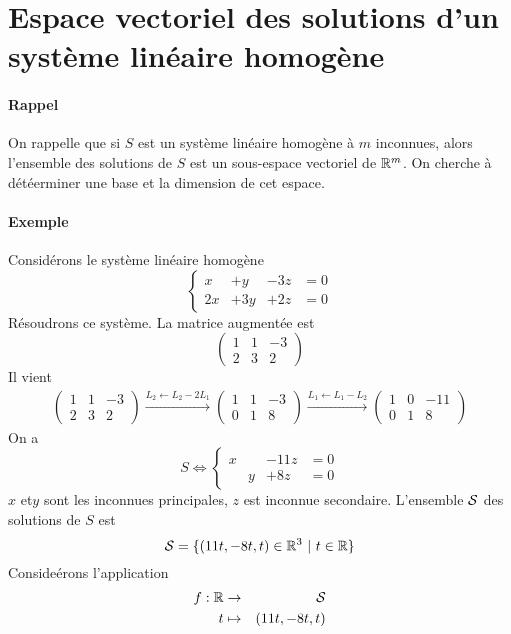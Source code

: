%
%
\section{Espace vectoriel des solutions d'un système linéaire homogène}
%
%
\paragraph{Rappel} On rappelle que si $S$ est un système linéaire homogène à $m$ inconnues, alors l'ensemble des solutions de $S$ est un sous-espace vectoriel de $\mathbb{R}^m$. On cherche à détéerminer une base et la dimension de cet espace.

\paragraph{Exemple} Considérons le système linéaire homogène
$$\left\{\begin{array}{cccc}
   x & + y & -3z & = 0 \\
  2x & +3y & +2z & = 0
\end{array}\right. $$
Résoudrons ce système. La matrice augmentée est
$$\begin{pmatrix}
 1 & 1 & -3 \\
 2 & 3 & 2
\end{pmatrix}$$
Il vient
\begin{eqnarray*}
  \begin{pmatrix} 
    1 & 1 &-3 \\ 
    2 &3 & 2
  \end{pmatrix} 
  \xrightarrow{L_2 \leftarrow L_2 - 2L_1}
  \begin{pmatrix}
    1 & 1 &-3 \\ 
    0 & 1 & 8
  \end{pmatrix} 
  \xrightarrow{L_1 \leftarrow L_1 - L_2}
  \begin{pmatrix} 
    1 & 0 & -11 \\ 
    0 & 1 & 8
  \end{pmatrix}
\end{eqnarray*}
On a 
$$S \Leftrightarrow \left\{\begin{array}{cccc} x & & -11 z & = 0 \\ & y & +8 z & = 0 \end{array} \right.$$
$x$ et$y$ sont les inconnues principales, $z$ est inconnue secondaire. L'ensemble $\mathcal{S}$ des solutions de $S$ est 
$$\mathcal{S} = \{(11t, -8t, t) \in \mathbb{R}^3 ~ \vert ~ t \in \mathbb{R} \}$$
Consideérons l'application
\begin{eqnarray*}
  f: \mathbb{R} &\rightarrow& \mathcal{S} \\
  t &\mapsto & (11t, -8t, t)
\end{eqnarray*}
